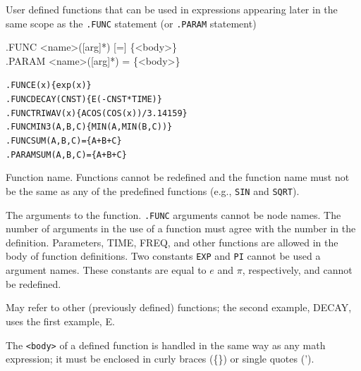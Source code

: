 


User defined functions that can be used in expressions appearing later 
in the same scope as the \texttt{.FUNC} statement (or \texttt{.PARAM} statement)

\begin{Command}
\format
.FUNC <name>([arg]*) [=] \{<body>\} \\
.PARAM <name>([arg]*) = \{<body>\}

\examples
\begin{alltt}
.FUNC E(x) \{exp(x)\}
.FUNC DECAY(CNST) \{E(-CNST*TIME)\}
.FUNC TRIWAV(x) \{ACOS(COS(x))/3.14159\}
.FUNC MIN3(A,B,C) \{MIN(A,MIN(B,C))\}
.FUNC SUM(A,B,C)=\{A+B+C\}
.PARAM SUM(A,B,C)=\{A+B+C\}
\end{alltt}

\arguments

\begin{Arguments}

Function name.  Functions cannot be redefined and the function name must 
not be the same as any of the
predefined functions (e.g., \texttt{SIN} and \texttt{SQRT}).  


The arguments to the function.  \texttt{.FUNC} arguments cannot be node names.
The number of arguments in the use of a function must agree with the number 
in the definition. Parameters, TIME, FREQ, and other functions are allowed in 
the body of function definitions.  
Two constants \texttt{EXP} and \texttt{PI} cannot
be used a argument names.  These constants are equal to $e$ and $\pi$, respectively,
and cannot be redefined.


May refer to other (previously defined) functions; the second example, 
DECAY, uses the first example, E. 

\end{Arguments}

\comments

The \texttt{<body>} of a defined function is handled in the same way as any 
math expression; it must be enclosed in curly braces (\{\}) or single quotes (').


\end{Command}
